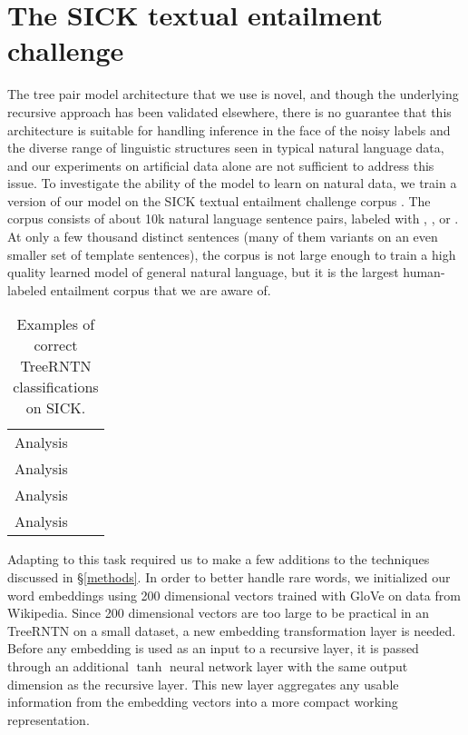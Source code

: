 \section{The SICK textual entailment challenge}\label{sec:sick}

The tree pair model architecture that we use is novel, and though the underlying recursive approach has been validated elsewhere, there is no guarantee that this architecture is suitable for handling inference in the face of the noisy labels and the diverse range of linguistic structures seen in typical natural language data, and our experiments on artificial data alone are not sufficient to address this issue. To investigate the ability of the model to learn on natural data, we train a version of our model on the SICK textual entailment challenge corpus \cite{marelli2014sick}. The corpus consists of about 10k natural language sentence pairs, labeled with , , or . At only a few thousand distinct sentences (many of them variants on an even smaller set of template sentences), the corpus is not large enough to train a high quality learned model of general natural language, but it is the largest human-labeled entailment corpus that we are aware of.

\begin{table*}[htp]
  \centering\small
  \begin{tabular}{lcl}
    \toprule
Analysis\\
Analysis\\
Analysis\\
Analysis\\
    \bottomrule
  \end{tabular}
  \caption{\label{examplesofsickdata}Examples of correct TreeRNTN classifications on SICK.}
\end{table*} %

Adapting to this task required us to make a few additions to the techniques discussed in \S\ref{methods}. In order to better handle rare words, we initialized our word embeddings using 200 dimensional vectors trained with 
GloVe \cite{pennington2014glove} on data from Wikipedia. Since 200 dimensional vectors are too large to be practical in an TreeRNTN on a small dataset, a new embedding transformation layer is needed. Before any embedding is used as an input to a recursive layer, it is passed through an additional $\tanh$ neural network layer with the same output dimension as the recursive layer. This new layer aggregates any usable information from the embedding vectors into a more compact working representation.

